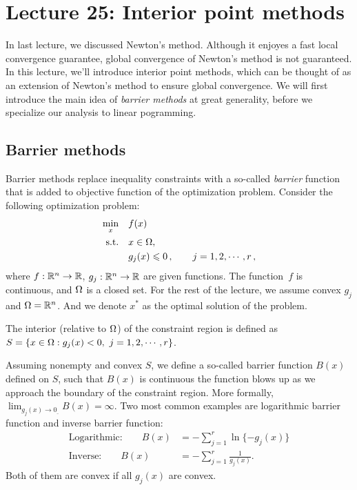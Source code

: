 \section{Lecture 25: Interior point methods}
In last lecture, we discussed Newton's method. Although it enjoyes a fast local
convergence guarantee, global convergence of Newton's method is not guaranteed. 
In this lecture, we'll introduce interior point methods, which can be thought of
as an extension of Newton's method to ensure global convergence.  We will first
introduce the main idea of \emph{barrier methods} at great generality, before we
specialize our analysis to linear pogramming.

\subsection{Barrier methods}
Barrier methods replace inequality constraints with a so-called \emph{barrier}
function that is added to objective function of the optimization problem. 
Consider the following optimization problem: 
\begin{align*}
\min_x  &\quad f(x)\\
\text{s.t.} &\quad x\in{\Omega},\\
&\quad g_j(x)\leqslant{0}\,,\qquad j=1,2,\cdots,r\,,
\end{align*}
where $f:\mathbb{R}^n\rightarrow\mathbb{R}$, $g_j:\mathbb{R}^n\rightarrow\mathbb{R}$ are given functions. 
The function~$f$ is continuous, and $\Omega$ is a closed set. For the rest of the lecture, we assume convex $g_j$ and $\Omega=\mathbb{R}^n$. And we denote $x^*$ as the optimal solution of the problem.

\begin{definition}
The interior (relative to $\Omega$) of the constraint region is defined as $S=\{x\in\domain:g_j(x)<0,\ j=1,2,\cdots,r\}$. 
\end{definition}

Assuming nonempty and convex $S$, we define a so-called barrier function $B(x)$
defined on $S$, such that $B(x)$ is continuous the function blows up as we
approach the boundary of the constraint region. More formally,
$\lim_{g_j(x)\rightarrow{0_{\_}}}B(x)=\infty$. Two most common examples are
logarithmic barrier function and inverse barrier function: 
\begin{align}
\text{Logarithmic:}\qquad B(x) &= -\sum_{j=1}^{r}\ln\{-g_j(x)\}\\
\text{Inverse:}\qquad B(x) &= -\sum_{j=1}^{r}\frac{1}{g_j(x)}.
\end{align}
Both of them are convex if all $g_j(x)$ are convex. 

